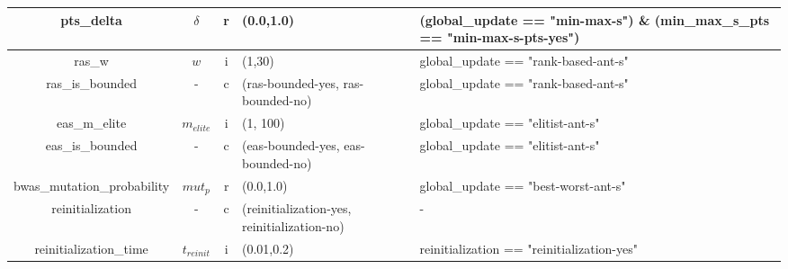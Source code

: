 \documentclass[11pt,a4paper,oneside]{book}
\begin{document}
\begin{table}[]
\begin{tabular}{|c|c|c|p{4cm}|p{4cm}|}
pts\_delta                      & $\delta$   & r    & (0.0,1.0)                                                                      & (global\_update == "min-max-s") \& (min\_max\_s\_pts == "min-max-s-pts-yes")                  \\ \hline
ras\_w                          & $w$        & i    & (1,30)                                                                         & global\_update == "rank-based-ant-s"                                                          \\ \hline
ras\_is\_bounded                & -          & c    & (ras-bounded-yes, ras-bounded-no)                                               & global\_update == "rank-based-ant-s"                                                          \\ \hline
eas\_m\_elite                   & $m_{elite}$ & i   & (1, 100)                                                                       & global\_update == "elitist-ant-s"                                                             \\ \hline
eas\_is\_bounded                & -          & c    & (eas-bounded-yes, eas-bounded-no)                                               & global\_update == "elitist-ant-s"                                                             \\ \hline
bwas\_mutation\_probability     & $mut_p$    & r    & (0.0,1.0)                                                                      & global\_update == "best-worst-ant-s"                                                          \\ \hline
reinitialization                & -          & c    & (reinitialization-yes, reinitialization-no)                                     & -                                                                                             \\ \hline
reinitialization\_time          & $t_{reinit}$ & i    & (0.01,0.2)                                                                     & reinitialization == "reinitialization-yes"                                                    \\ \hline
\end{tabular}
\end{table}
\end{document}
